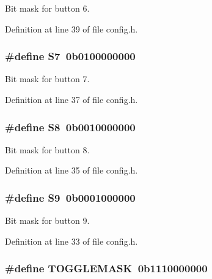 Bit mask for button 6. 



Definition at line 39 of file config.\+h.

\subsubsection[{\texorpdfstring{S7}{S7}}]{\setlength{\rightskip}{0pt plus 5cm}\#define S7~0b0100000000}\hypertarget{group__buttons_ga6580eeddd36d0d97cdde6f6a4695ed12}{}\label{group__buttons_ga6580eeddd36d0d97cdde6f6a4695ed12}


Bit mask for button 7. 



Definition at line 37 of file config.\+h.

\subsubsection[{\texorpdfstring{S8}{S8}}]{\setlength{\rightskip}{0pt plus 5cm}\#define S8~0b0010000000}\hypertarget{group__buttons_ga4516955061f24ae7162de20aff005c9b}{}\label{group__buttons_ga4516955061f24ae7162de20aff005c9b}


Bit mask for button 8. 



Definition at line 35 of file config.\+h.

\subsubsection[{\texorpdfstring{S9}{S9}}]{\setlength{\rightskip}{0pt plus 5cm}\#define S9~0b0001000000}\hypertarget{group__buttons_ga6eef6bdffd8bac54d6b4be0176dd20ff}{}\label{group__buttons_ga6eef6bdffd8bac54d6b4be0176dd20ff}


Bit mask for button 9. 



Definition at line 33 of file config.\+h.

\subsubsection[{\texorpdfstring{T\+O\+G\+G\+L\+E\+M\+A\+SK}{TOGGLEMASK}}]{\setlength{\rightskip}{0pt plus 5cm}\#define T\+O\+G\+G\+L\+E\+M\+A\+SK~0b1110000000}\hypertarget{group__buttons_ga77a6549a849f9a9472a367e4148289b7}{}\label{group__buttons_ga77a6549a849f9a9472a367e4148289b7}


